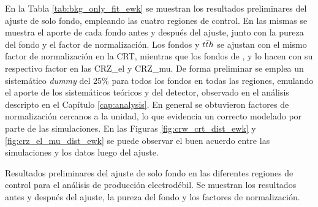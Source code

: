 En la Tabla \ref{tab:bkg_only_fit_ewk} se muestran los resultados preliminares del ajuste de solo fondo, empleando las cuatro regiones de control. En las mismas se muestra el aporte de cada fondo antes y después del ajuste, junto con la pureza del fondo y el factor de normalización. Los fondos \ttbarph y $t\bar{t} h$ se ajustan con el mismo factor de normalización en la CRT, mientras que los fondos de \znunuph, \zeeph y \zmumuph lo hacen con su respectivo factor en las CRZ\_el y CRZ\_mu. De forma preliminar se emplea un sistemático \textit{dummy} del $25\%$ para todos los fondos en todas las regiones, emulando el aporte de los sistemáticos teóricos y del detector, observado en el análisis descripto en el Capítulo \ref{cap:analysis}. En general se obtuvieron factores de normalización cercanos a la unidad, lo que evidencia un correcto modelado por parte de las simulaciones. En las Figuras \ref{fig:crw_crt_dist_ewk} y \ref{fig:crz_el_mu_dist_ewk} se puede observar el buen acuerdo entre las simulaciones y los datos luego del ajuste.

\begin{table}
  \centering
  \caption{Resultados preliminares del ajuste de solo fondo en las diferentes regiones de control para el análisis de producción electrodébil. Se muestran los resultados antes y después del ajuste, la pureza del fondo y los factores de normalización.}
  \resizebox{\textwidth}{!}{}
  \label{tab:bkg_only_fit_ewk}
\end{table}


